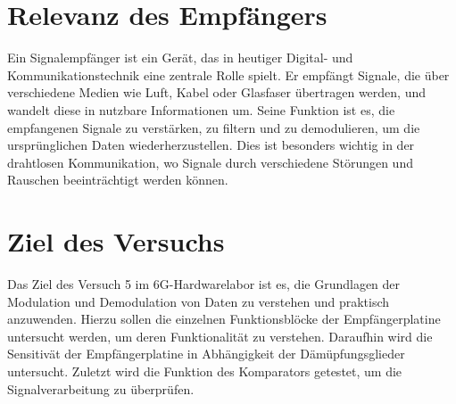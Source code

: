 \section{Relevanz des Empfängers}
    Ein Signalempfänger ist ein Gerät, das in heutiger Digital- und Kommunikationstechnik eine zentrale Rolle spielt. Er empfängt Signale, die über verschiedene Medien wie Luft, Kabel oder Glasfaser übertragen werden, und wandelt diese in nutzbare Informationen um.
    Seine Funktion ist es, die empfangenen Signale zu verstärken, zu filtern und zu demodulieren, um die ursprünglichen Daten wiederherzustellen. Dies ist besonders wichtig in der drahtlosen Kommunikation, wo Signale durch verschiedene Störungen und Rauschen beeinträchtigt werden können.
\section{Ziel des Versuchs}
    Das Ziel des Versuch 5 im 6G-Hardwarelabor ist es, die Grundlagen der Modulation und Demodulation von Daten zu verstehen und praktisch anzuwenden. Hierzu sollen die einzelnen Funktionsblöcke der Empfängerplatine untersucht werden, um deren Funktionalität zu verstehen. Daraufhin wird die Sensitivät der Empfängerplatine in Abhängigkeit der Dämüpfungsglieder untersucht. Zuletzt wird die Funktion des Komparators getestet, um die Signalverarbeitung zu überprüfen.
\clearpage